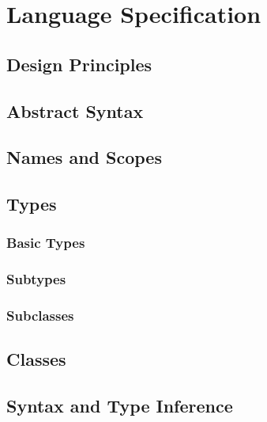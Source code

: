 \part{Language Specification}
\chapter{Design Principles}

\chapter{Abstract Syntax}

\chapter{Names and Scopes}

\chapter{Types}
\section{Basic Types}
\section{Subtypes}
\section{Subclasses}

\chapter{Classes}

\chapter{Syntax and Type Inference}
